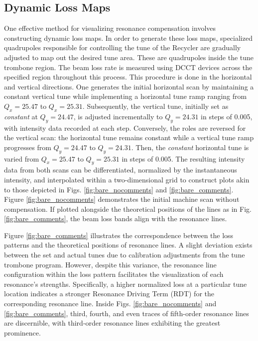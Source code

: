 \subsection{\label{sec:lossmaps}Dynamic Loss Maps}

One effective method for visualizing resonance compensation involves constructing dynamic loss maps. In order to generate these loss maps, specialized quadrupoles responsible for controlling the tune of the Recycler are gradually adjusted to map out the desired tune area. These are quadrupoles inside the tune trombone region. The beam loss rate is measured using DCCT devices across the specified region throughout this process. This procedure is done in the horizontal and vertical directions. One generates the initial horizontal scan by maintaining a constant vertical tune while implementing a horizontal tune ramp ranging from $Q_x=25.47$ to $Q_x=25.31$. Subsequently, the vertical tune, initially set as \textit{constant} at $Q_y=24.47$, is adjusted incrementally to $Q_y=24.31$ in steps of 0.005, with intensity data recorded at each step. Conversely, the roles are reversed for the vertical scan: the horizontal tune remains constant while a vertical tune ramp progresses from $Q_y=24.47$ to $Q_y=24.31$. Then, the \textit{constant} horizontal tune is varied from $Q_x=25.47$ to $Q_y=25.31$ in steps of 0.005. The resulting intensity data from both scans can be differentiated, normalized by the instantaneous intensity, and interpolated within a two-dimensional grid to construct plots akin to those depicted in Figs. \ref{fig:bare_nocomments} and \ref{fig:bare_comments}. Figure \ref{fig:bare_nocomments} demonstrates the initial machine scan without compensation. If plotted alongside the theoretical positions of the lines as in Fig. \ref{fig:bare_comments}, the beam loss bands align with the resonance lines. 

Figure \ref{fig:bare_comments} illustrates the correspondence between the loss patterns and the theoretical positions of resonance lines. A slight deviation exists between the set and actual tunes due to calibration adjustments from the tune trombone program. However, despite this variance, the resonance line configuration within the loss pattern facilitates the visualization of each resonance's strengths. Specifically, a higher normalized loss at a particular tune location indicates a stronger Resonance Driving Term (RDT) for the corresponding resonance line. Inside Figs. \ref{fig:bare_nocomments} and \ref{fig:bare_comments}, third, fourth, and even traces of fifth-order resonance lines are discernible, with third-order resonance lines exhibiting the greatest prominence.

